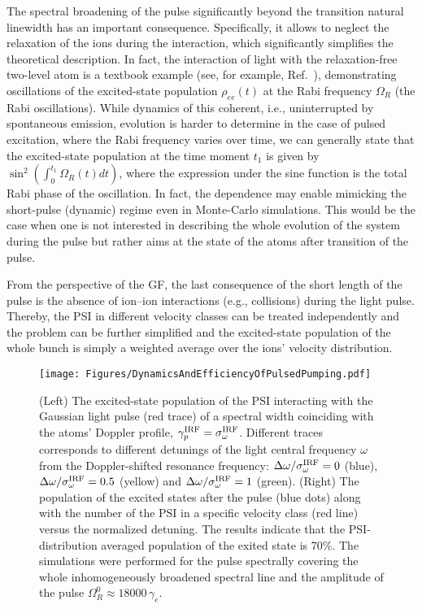 The spectral broadening of the pulse significantly beyond the transition natural linewidth has an important consequence.  Specifically, it allows to neglect the relaxation of the ions during the interaction, which significantly simplifies the theoretical description.  In fact, the interaction of light with the relaxation-free two-level atom is a textbook example (see, for example, Ref.\ \cite{Letohov1977Nonlinear}), demonstrating oscillations of the excited-state population $\rho_{ee}(t)$ at the Rabi frequency $\Omega_R$ (the Rabi oscillations).  While dynamics of this coherent, i.e., uninterrupted by spontaneous emission, evolution is harder to determine in the case of pulsed excitation, where the Rabi frequency varies over time, we can generally state that the excited-state population at the time moment $t_1$ is given by $\sin^2\left(\int_0^{t_1}\Omega_R(t)dt\right)$, where the expression under the sine function is the total Rabi phase of the oscillation.  In fact, the dependence may enable mimicking the short-pulse (dynamic) regime even in Monte-Carlo simulations.  This would be the case when one is not interested in describing the whole evolution of the system during the pulse but rather aims at the state of the atoms after transition of the pulse.

From the perspective of the GF, the last consequence of the short length of the pulse is the absence of ion--ion interactions (e.g., collisions) during the light pulse.  Thereby, the PSI in different velocity classes can be treated independently and the problem can be further simplified and the excited-state population of the whole bunch is simply a weighted average over the ions' velocity distribution.  

\begin{figure*}[!htbp]
    \centering
    \texttt{[image: Figures/DynamicsAndEfficiencyOfPulsedPumping.pdf]}
    \caption{(Left) The excited-state population of the PSI interacting with the Gaussian light pulse (red trace) of a spectral width coinciding with the atoms' Doppler profile, $\gamma_p^{\rm IRF}=\sigma_\omega^{\rm IRF}$.  Different traces corresponds to different detunings of the light central frequency $\omega$ from the Doppler-shifted resonance frequency: $\Delta\omega/\sigma_\omega^{\rm IRF}=0$ (blue), $\Delta\omega/\sigma_\omega^{\rm IRF}=0.5$ (yellow) and $\Delta\omega/\sigma_\omega^{\rm IRF}=1$ (green).  (Right) The population of the excited states after the pulse (blue dots) along with the number of the PSI in a specific velocity class (red line) versus the normalized detuning.  The results indicate that the PSI-distribution averaged population of the exited state is 70\%. The simulations were performed for the pulse spectrally covering the whole inhomogeneously broadened spectral line and the amplitude of the pulse $\Omega_R^0\approx18000\,\gamma_e$.}
    \label{fig:RabiOscillationsPulsed}
\end{figure*}

